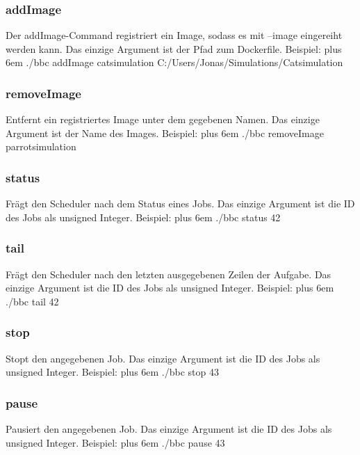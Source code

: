 \documentclass[a4paper,12pt]{article}
\makeatletter
\newenvironment{mycode}
 {\def\@xobeysp{\ }\verbatim\rightskip=0pt plus 6em\relax}
 {\endverbatim}
\makeatother
\begin{document}
\subsubsection{addImage}
Der addImage-Command registriert ein Image, sodass es mit --image eingereiht werden kann.
Das einzige Argument ist der Pfad zum Dockerfile.
Beispiel: \newline
\begin{mycode}
	./bbc addImage catsimulation C:/Users/Jonas/Simulations/Catsimulation	
\end{mycode}
\subsubsection{removeImage}
Entfernt ein registriertes Image unter dem gegebenen Namen. Das einzige Argument ist der Name des Images.
Beispiel: \newline
\begin{mycode}
	./bbc removeImage parrotsimulation
\end{mycode}
\subsubsection{status}
Frägt den Scheduler nach dem Status eines Jobs. Das einzige Argument ist die ID des Jobs als unsigned Integer. Beispiel: \newline
\begin{mycode}
	./bbc status 42
\end{mycode}
\subsubsection{tail}
Frägt den Scheduler nach den letzten ausgegebenen Zeilen der Aufgabe. Das einzige Argument ist die ID des Jobs als unsigned Integer. Beispiel: \newline
\begin{mycode}
	./bbc tail 42
\end{mycode}
\subsubsection{stop}
Stopt den angegebenen Job. Das einzige Argument ist die ID des Jobs als unsigned Integer. Beispiel: \newline
\begin{mycode}
	./bbc stop 43
\end{mycode}
\subsubsection{pause}
Pausiert den angegebenen Job. Das einzige Argument ist die ID des Jobs als unsigned Integer. Beispiel: \newline
\begin{mycode}
	./bbc pause 43
\end{mycode}
\end{document}
